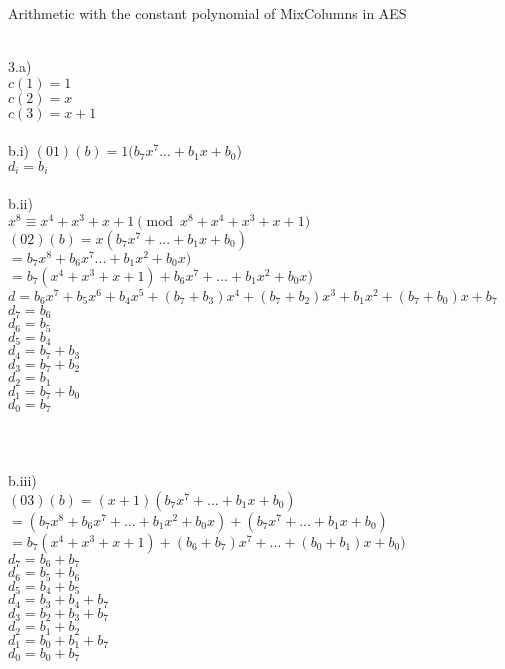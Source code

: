 \documentclass{assignment}
\begin{document}
\begin{problemlist}
\pbitem Arithmetic with the constant polynomial of MixColumns in AES
\begin{problem}
\begin{answer}
\\
3.a)\\
$c(1)=1$\\
$c(2)=x$\\
$c(3)=x+1$\\
\\
b.i)   
$(01)(b)=1(b_7x^7...+b_1x+b_0$)\\
$d_i=b_i$\\
\\
b.ii)\\
$x^8\equiv x^4+x^3+x+1 \pmod {x^8+x^4+x^3+x+1}$\\
$(02)(b)=x(b_7x^7+...+b_1x+b_0)$\\
$=b_7x^8+b_6x^7...+b_1x^2+b_0x)$\\
$=b_7(x^4+x^3+x+1)+b_6x^7+...+b_1x^2+b_0x)$\\
$d=b_6x^7+b_5x^6+b_4x^5+(b_7+b_3)x^4+(b_7+b_2)x^3+b_1x^2+(b_7+b_0)x+b_7$\\
$d_7=b_6$\\
$d_6=b_5$\\
$d_5=b_4$\\
$d_4=b_7+b_3$\\
$d_3=b_7+b_2$\\
$d_2=b_1$\\
$d_1=b_7+b_0$\\
$d_0=b_7$\\
\\
\\
\\
b.iii)\\
$(03)(b)=(x+1)(b_7x^7+...+b_1x+b_0)$\\
$=(b_7x^8+b_6x^7+...+b_1x^2+b_0x)+(b_7x^7+...+b_1x+b_0)$\\
$=b_7(x^4+x^3+x+1)+(b_6+b_7)x^7+...+(b_0+b_1)x+b_0)$\\
$d_7=b_6+b_7$\\
$d_6=b_5+b_6$\\
$d_5=b_4+b_5$\\
$d_4=b_3+b_4 +b_7$\\
$d_3=b_2+b_3 +b_7$\\
$d_2=b_1+b_2$\\
$d_1=b_0+b_1 +b_7$\\
$d_0=b_0 +b_7$\\


\end{answer}
\end{problem}
\end{problemlist}
\end{document}
